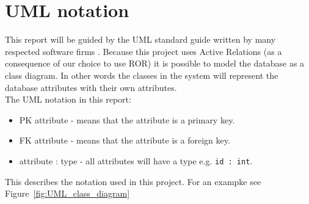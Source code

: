 \section{UML notation} \label{section:uml_notation}

This report will be guided by the UML standard guide written by many respected software firms \citep{UML_notation}.
Because this project uses Active Relations (as a consequence of our choice to use ROR) it is possible to model the database as a class diagram. 
In other words the classes in the system will represent the database attributes with their own attributes. \\

The UML notation in this report:
\begin{itemize}
	\item PK attribute - means that the attribute is a primary key.
	\item FK attribute - means that the attribute is a foreign key.
	\item attribute : type - all attributes will have a type e.g. \verb+id : int+.
\end{itemize}

This describes the notation used in this project. For an exampke see Figure~\ref{fig:UML_class_diagram}